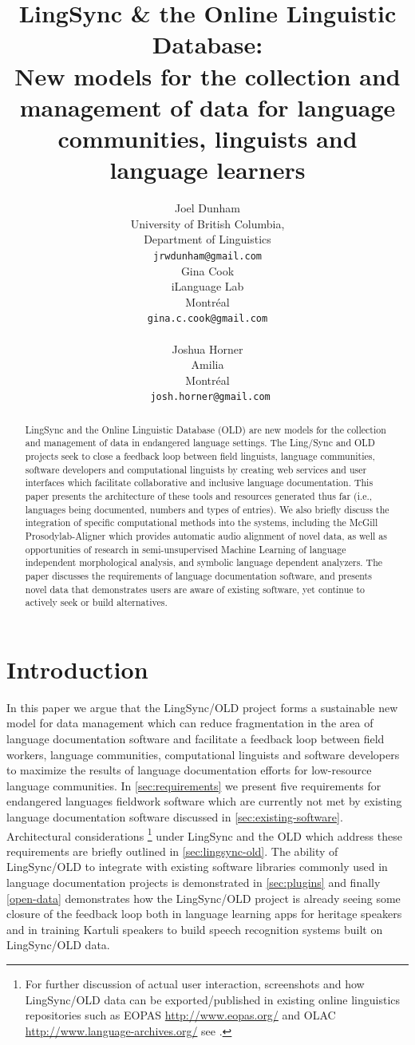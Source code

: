 \documentclass[11pt]{article}
\title{LingSync \& the Online Linguistic Database:\\New models for the
    collection and management of data for language communities, linguists and
language learners}
\author{Joel Dunham \\
University of British Columbia,   \\
Department of Linguistics \\
{\tt jrwdunham@gmail.com} \\\And
Gina Cook \\
iLanguage Lab \\
Montr\'eal \\
{\tt gina.c.cook@gmail.com} \\  \\\And
Joshua Horner \\
Amilia  \\
Montr\'eal \\
{\tt ~josh.horner@gmail.com} \\ }
\date{}
\begin{document}
\maketitle

\begin{abstract}
LingSync and the Online Linguistic Database (OLD) are new models for the
collection and management of data in endangered language settings. The
Ling\-/Sync and OLD projects seek to close a feedback loop  between field
linguists, language communities, software developers and computational
linguists  by creating web services and user interfaces which facilitate
collaborative and inclusive language documentation. This paper presents the
architecture of these tools and resources generated thus far (i.e., languages
being documented, numbers and types of entries). We also briefly discuss the
integration of specific computational methods into the systems, including the
McGill Prosodylab-Aligner which provides automatic audio alignment of novel
data, as well as opportunities of research in semi-unsupervised Machine
Learning of  language independent morphological analysis, and symbolic language
dependent analyzers.  The paper discusses the requirements of language
documentation software, and presents novel data that demonstrates users are
aware of existing software, yet continue to actively seek or build alternatives.
\end{abstract}


\section{Introduction}

In this paper we argue that the LingSync/OLD project forms a sustainable new
model for data management which can reduce fragmentation in the area of
language documentation software and facilitate a feedback loop between field
workers, language communities, computational linguists and software developers
to maximize the results of language documentation efforts for low-resource
language communities. In \autoref{sec:requirements} we present five
requirements for endangered languages fieldwork software  which
are currently not met by existing language documentation software discussed in
\autoref{sec:existing-software}. Architectural considerations%
\footnote{For further discussion of actual user interaction, screenshots and
    how LingSync/OLD data can be exported/published in existing online
    linguistics repositories such as EOPAS \url{http://www.eopas.org/} and OLAC
    \url{http://www.language-archives.org/} see \cite{lingsync:2012}.} %
under LingSync and the OLD which address these requirements are briefly
outlined in \autoref{sec:lingsync-old}.  The ability of LingSync/OLD to
integrate with existing software libraries commonly used in language
documentation projects is demonstrated in \autoref{sec:plugins} and finally
\autoref{open-data} demonstrates how the LingSync/OLD project is already
seeing some closure of the feedback loop both in language learning apps for
heritage speakers and in training Kartuli speakers to build speech recognition
systems built on LingSync/OLD data.  
\end{document}

